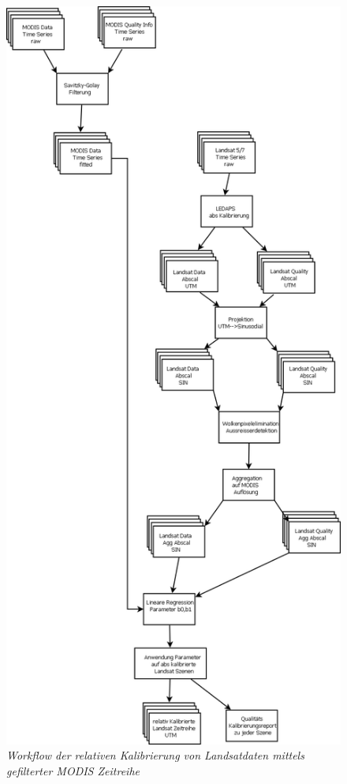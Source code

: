 \documentclass[11pt]{report}
\begin{document}
\begin{figure}[H]
\centering
\includegraphics[width=\textwidth,height=\textheight]{./Diagramme/Workflow_rel_Kal.PNG}
\caption{\textit{Workflow der relativen Kalibrierung von Landsatdaten mittels gefilterter MODIS Zeitreihe}}
\end{figure}
\end{document}
